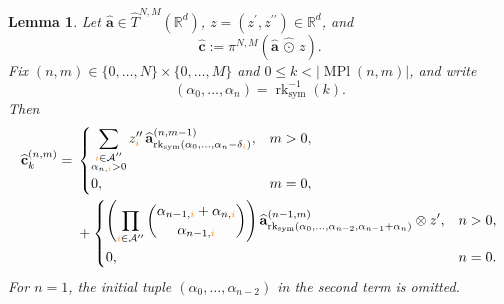 \documentclass{amsart}
\newtheorem{lemma}[theorem]{Lemma}
\theoremstyle{definition}
\theoremstyle{remark}
\newcommand{\orange}[1]{{\color{orange}#1}}
\begin{document}
\begin{lemma}
\label{lem:symmetrized_shear_first_level_action}
Let
$\widehat{\mathbf{a}}\in\widehat{T}^{N,M}(\mathbb{R}^d)$,
$z=(z^{\prime},z^{\prime\prime})\in\mathbb{R}^d$, and
\[
    \widehat{\mathbf{c}}
    :=
    \pi^{N,M}
    \left(
        \widehat{\mathbf{a}}
        \,\widehat{\odot}\,
        z
    \right).
\]
Fix
$(n,m)\in\{0,\ldots,N\}\times\{0,\ldots,M\}$ and
$0\leq k<|\operatorname{MPl}(n,m)|$, and write
\[
    (\alpha_0,\ldots,\alpha_n)
    =
    \operatorname{rk}_{\mathrm{sym}}^{-1}(k).
\]
Then
\[
\begin{aligned}
    \widehat{\mathbf{c}}^{(n,m)}_k
    ={}&
    \begin{cases}
        \displaystyle
        \sum_{\substack{
            \orange{i}\in\mathcal{A}^{\prime\prime}\\
            \alpha_{n,\orange{i}}>0
        }}
        z^{\prime\prime}_{\orange{i}}\,
        \widehat{\mathbf{a}}^{(n,m-1)}_{
            \operatorname{rk}_{\mathrm{sym}}
            \left(
                \alpha_0,\ldots,
                \alpha_n-\delta_{\orange{i}}
            \right)
        },
        &
        m>0,
        \\[1.2em]
        0,
        &
        m=0,
    \end{cases}
    \\
    &+
    \begin{cases}
        \displaystyle
        \left(
            \prod_{\orange{i}\in\mathcal{A}^{\prime\prime}}
            \binom{
                \alpha_{n-1,\orange{i}}
                +
                \alpha_{n,\orange{i}}
            }{
                \alpha_{n-1,\orange{i}}
            }
        \right)
        \widehat{\mathbf{a}}^{(n-1,m)}_{
            \operatorname{rk}_{\mathrm{sym}}
            \left(
                \alpha_0,\ldots,\alpha_{n-2},
                \alpha_{n-1}+\alpha_n
            \right)
        }
        \otimes z^{\prime},
        &
        n>0,
        \\[1.2em]
        0,
        &
        n=0.
    \end{cases}
\end{aligned}
\]
For $n=1$, the initial tuple
$(\alpha_0,\ldots,\alpha_{n-2})$ in the second term is omitted.
\end{lemma}
\end{document}

